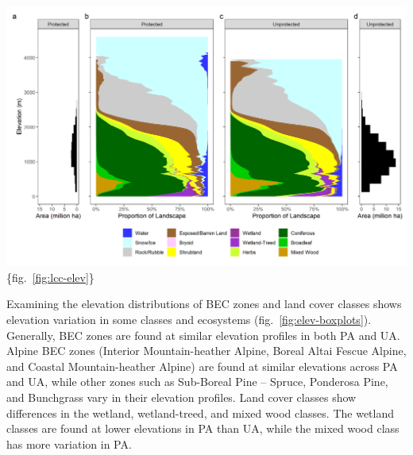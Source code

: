 \documentclass[11pt]{article}
\makeatletter
\def\maxwidth{\ifdim\Gin@nat@width>\linewidth\linewidth
\else\Gin@nat@width\fi}
\let\Oldincludegraphics\includegraphics
\renewcommand{\includegraphics}[1]{\Oldincludegraphics[width=\maxwidth]{#1}}
\makeatother
\begin{document}
\includegraphics{figures/lcc_elev_hist.png}\{fig.~\ref{fig:lcc-elev}\}

Examining the elevation distributions of BEC zones and land cover
classes shows elevation variation in some classes and ecosystems
(fig.~\ref{fig:elev-boxplots}). Generally, BEC zones are found at
similar elevation profiles in both PA and UA. Alpine BEC zones (Interior
Mountain-heather Alpine, Boreal Altai Fescue Alpine, and Coastal
Mountain-heather Alpine) are found at similar elevations across PA and
UA, while other zones such as Sub-Boreal Pine -- Spruce, Ponderosa Pine,
and Bunchgrass vary in their elevation profiles. Land cover classes show
differences in the wetland, wetland-treed, and mixed wood classes. The
wetland classes are found at lower elevations in PA than UA, while the
mixed wood class has more variation in PA.
\end{document}
